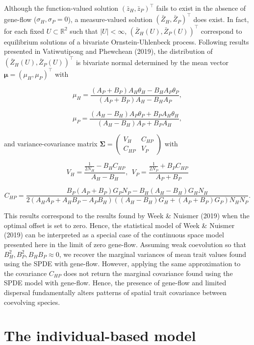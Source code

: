 \documentclass{article}
\begin{document}
Although the function-valued solution \((\bar z_H,\bar z_P)^\top\) fails
to exist in the absence of gene-flow (\(\sigma_H,\sigma_P=0\)), a
measure-valued solution \((\bar Z_H,\bar Z_P)^\top\) does exist. In
fact, for each fixed \(U\subset\mathbb R^2\) such that \(|U|<\infty\),
\((\bar Z_H(U),\bar Z_P(U))^\top\) correspond to equilibrium solutions
of a bivariate Ornstein-Uhlenbeck process. Following results presented
in Vatiwutipong and Phewchean (2019), the distribution of
\((\bar Z_H(U),\bar Z_P(U))^\top\) is bivariate normal determined by the
mean vector \(\pmb\mu=(\mu_H,\mu_P)^\top\) with

\[\mu_H=\frac{(A_P+B_P)A_H\theta_H-B_HA_P\theta_P}{(A_P+B_P)A_H-B_HA_P},\]

\[\mu_P=\frac{(A_H-B_H)A_P\theta_P+B_PA_H\theta_H}{(A_H-B_H)A_P+B_PA_H},\]

and variance-covariance matrix
\(\pmb\Sigma=\left(\begin{smallmatrix}V_H & C_{HP} \\ C_{HP} & V_P\end{smallmatrix}\right)\)
with

\[V_H=\frac{\frac{1}{2N_H}-B_HC_{HP}}{A_H-B_H}, \ \ V_P=\frac{\frac{1}{2N_P}+B_PC_{HP}}{A_P+B_P}\]

\[C_{HP}=\frac{B_P(A_P+B_P)G_PN_P-B_H(A_H-B_H)G_HN_H}{2(A_HA_P+A_HB_P-A_PB_H)((A_H-B_H)G_H+(A_P+B_P)G_P)N_HN_P}.\]

This results correspond to the results found by Week \& Nuismer (2019)
when the optimal offset is set to zero. Hence, the statistical model of
Week \& Nuismer (2019) can be interpreted as a special case of the
continuous space model presented here in the limit of zero gene-flow.
Assuming weak coevolution so that \(B_H^2,B_P^2,B_HB_P\approx0\), we
recover the marginal variances of mean trait values found using the SPDE
with gene-flow. However, applying the same approximation to the
covariance \(C_{HP}\) does not return the marginal covariance found
using the SPDE model with gene-flow. Hence, the presence of gene-flow
and limited dispersal fundamentally alters patterns of spatial trait
covariance between coevolving species.

\hypertarget{the-individual-based-model}{%
\section{\texorpdfstring{The individual-based model
\label{ibs-app}}{The individual-based model }}\label{the-individual-based-model}}
\end{document}
